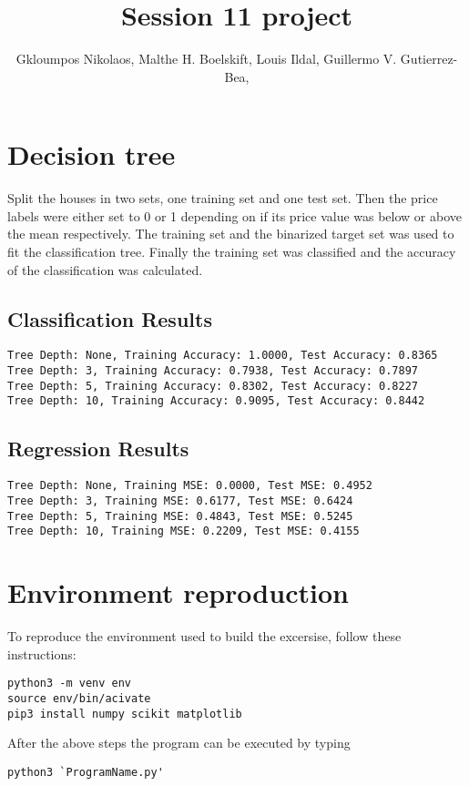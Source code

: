 \documentclass{article}
\title{Session 11 project}
\author {
      Gkloumpos Nikolaos,
      Malthe H. Boelskift,
      Louis Ildal,
      Guillermo V. Gutierrez-Bea,
}
\begin{document}
\maketitle


\section{Decision tree} 
Split the houses in two sets, one training set and one test set. Then the price labels were either set to 0 or 1 depending on if its price value was below or above the mean respectively. The training set and the binarized target set was used to fit the classification tree. Finally the training set was classified and the accuracy of the classification was calculated.

\subsection{Classification Results}
\begin{verbatim}
Tree Depth: None, Training Accuracy: 1.0000, Test Accuracy: 0.8365
Tree Depth: 3, Training Accuracy: 0.7938, Test Accuracy: 0.7897
Tree Depth: 5, Training Accuracy: 0.8302, Test Accuracy: 0.8227
Tree Depth: 10, Training Accuracy: 0.9095, Test Accuracy: 0.8442
\end{verbatim}

\subsection{Regression Results}
\begin{verbatim}
Tree Depth: None, Training MSE: 0.0000, Test MSE: 0.4952
Tree Depth: 3, Training MSE: 0.6177, Test MSE: 0.6424
Tree Depth: 5, Training MSE: 0.4843, Test MSE: 0.5245
Tree Depth: 10, Training MSE: 0.2209, Test MSE: 0.4155
\end{verbatim}

\section {Environment reproduction}
To reproduce the environment used to build the excersise, follow these instructions:

\begin{verbatim}
python3 -m venv env
source env/bin/acivate
pip3 install numpy scikit matplotlib
\end{verbatim}

After the above steps the program can be executed by typing

\begin{verbatim}
python3 `ProgramName.py'
\end{verbatim}



\end{document}
